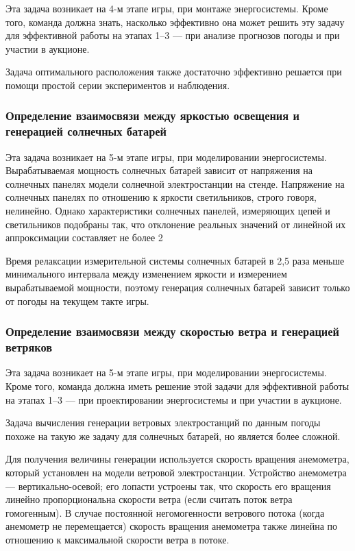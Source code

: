 Эта задача возникает на 4-м этапе игры, при монтаже энергосистемы. Кроме того, команда должна знать, насколько эффективно она может решить эту задачу для эффективной работы на этапах 1–3 — при анализе прогнозов погоды и при участии в аукционе.

Задача оптимального расположения также достаточно эффективно решается при помощи простой серии экспериментов и наблюдения.

\subsubsection*{Определение взаимосвязи между яркостью освещения и генерацией солнечных батарей}

Эта задача возникает на 5-м этапе игры, при моделировании энергосистемы. Вырабатываемая мощность солнечных батарей зависит от напряжения на солнечных панелях модели солнечной электростанции на стенде. Напряжение на солнечных панелях по отношению к яркости светильников, строго говоря, нелинейно. Однако характеристики солнечных панелей, измеряющих цепей и светильников подобраны так, что отклонение реальных значений от линейной их аппроксимации составляет не более 2%

Время релаксации измерительной системы солнечных батарей в 2,5 раза меньше минимального интервала между изменением яркости и измерением вырабатываемой мощности, поэтому генерация солнечных батарей зависит только от погоды на текущем такте игры.

\subsubsection*{Определение взаимосвязи между скоростью ветра и генерацией ветряков}

Эта задача возникает на 5-м этапе игры, при моделировании энергосистемы. Кроме того, команда должна иметь решение этой задачи для эффективной работы на этапах 1–3 — при проектировании энергосистемы и при участии в аукционе.

Задача вычисления генерации ветровых электростанций по данным погоды похоже на такую же задачу для солнечных батарей, но является более сложной.

Для получения величины генерации используется скорость вращения анемометра, который установлен на модели ветровой электростанции. Устройство анемометра — вертикально-осевой; его лопасти устроены так, что скорость его вращения линейно пропорциональна скорости ветра (если считать поток ветра гомогенным). В случае постоянной негомогенности ветрового потока (когда анемометр не перемещается) скорость вращения анемометра также линейна по отношению к максимальной скорости ветра в потоке.

